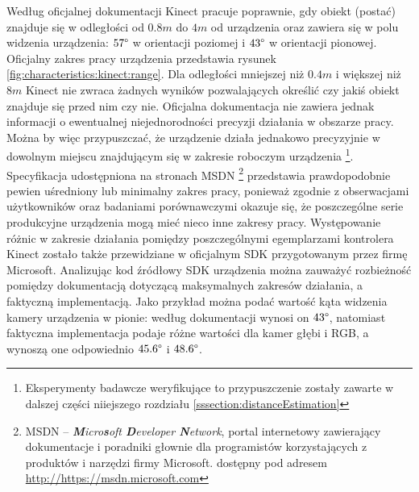 	Według oficjalnej dokumentacji \cite{kinectSpec2016} Kinect pracuje poprawnie, gdy obiekt (postać) znajduje się w odległości od $0.8m$ do $4m$ od urządzenia oraz zawiera się w polu widzenia urządzenia: $57\degree$ w orientacji poziomej i $43\degree$ w orientacji pionowej. Oficjalny zakres pracy urządzenia przedstawia rysunek \ref{fig:characteristics:kinect:range}. Dla odległości mniejszej niż $0.4m$ i większej niż $8m$ Kinect nie zwraca żadnych wyników pozwalających określić czy jakiś obiekt znajduje się przed nim czy nie. Oficjalna dokumentacja nie zawiera jednak informacji o ewentualnej niejednorodności precyzji działania w obszarze pracy. Można by więc przypuszczać, że urządzenie działa jednakowo precyzyjnie w dowolnym miejscu znajdującym się w zakresie roboczym urządzenia \footnote{Eksperymenty badawcze weryfikujące to przypuszczenie zostały zawarte w dalszej części niiejszego rozdziału \ref{sssection:distanceEstimation}}. 
	Specyfikacja udostępniona na stronach MSDN \footnote{MSDN -- \emph{\textbf{M}icro\textbf{s}oft \textbf{D}eveloper \textbf{N}etwork}, portal internetowy zawierający dokumentacje i poradniki głownie dla programistów korzystających z produktów i narzędzi firmy Microsoft. dostępny pod adresem \url{http://https://msdn.microsoft.com}}
	przedstawia prawdopodobnie pewien uśredniony lub minimalny zakres pracy, ponieważ zgodnie z obserwacjami użytkowników \cite{stack:kinect2011} oraz badaniami porównawczymi \cite{DiFilippo2015} okazuje się, że poszczególne serie produkcyjne urządzenia mogą mieć nieco inne zakresy pracy. Występowanie różnic w zakresie działania pomiędzy poszczególnymi egemplarzami kontrolera Kinect zostało także przewidziane w oficjalnym SDK przygotowanym przez firmę Microsoft\cite{msdn:kinectSDKConstants2016}. Analizując kod źródłowy SDK urządzenia można zauważyć rozbieżność pomiędzy dokumentacją dotyczącą maksymalnych zakresów działania, a faktyczną implementacją. Jako przykład można podać wartość kąta widzenia kamery urządzenia w pionie: według dokumentacji wynosi on $43\degree$, natomiast faktyczna implementacja podaje różne wartości dla kamer głębi i RGB, a wynoszą one odpowiednio $45.6\degree$ i $48.6\degree$. 
		
	
		
